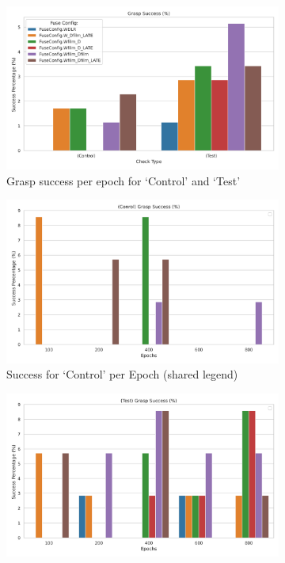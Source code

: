 \begin{figure}[H]
  \centering
  \begin{subfigure}{0.30\linewidth}
    \centering
    \includegraphics[width=\linewidth]{assets/evaluation/film/film-grasp-success-smaller.png}
    \caption{Grasp success per epoch for `Control' and `Test'}\label{subfig:film-smaller-grasp-success}
  \end{subfigure}
  \hfill
  \begin{subfigure}{0.30\linewidth}
    \centering
    \includegraphics[width=\linewidth]{assets/evaluation/film/film-grasp-control-success-epochs-smaller.png}
    \caption{Success for `Control' per Epoch (shared legend)}\label{subfig:film-grasp-control-success-epochs}
  \end{subfigure}
  \hfill
  \begin{subfigure}{0.30\linewidth}
    \centering
    \includegraphics[width=\linewidth]{assets/evaluation/film/film-grasp-test-success-epochs-smaller.png}

\end{subfigure}
\end{figure}
